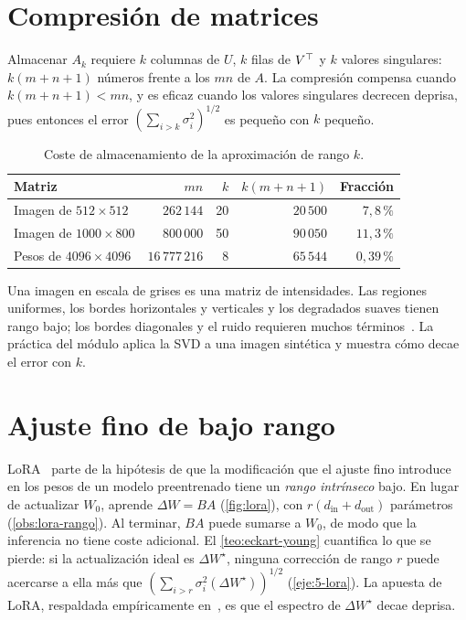 \addtocounter{definicion}{1}%

\section{Compresión de matrices}

Almacenar $A_k$ requiere $k$ columnas de $U$, $k$ filas de $V^{\top}$ y $k$ valores singulares: $k(m+n+1)$ números frente a los $mn$ de $A$. La compresión compensa cuando $k(m+n+1)<mn$, y es eficaz cuando los valores singulares decrecen deprisa, pues entonces el error $(\sum_{i>k}\sigma_i^{2})^{1/2}$ es pequeño con $k$ pequeño.

\begin{table}[h]
\centering\small
\caption{Coste de almacenamiento de la aproximación de rango $k$.}\label{tab:compresion}
\begin{tabular}{@{}lrrrr@{}}
\toprule
Matriz & $mn$ & $k$ & $k(m+n+1)$ & Fracción \\
\midrule
Imagen de $512\times 512$ & $262\,144$ & 20 & $20\,500$ & $7{,}8\,\%$ \\
Imagen de $1000\times 800$ & $800\,000$ & 50 & $90\,050$ & $11{,}3\,\%$ \\
Pesos de $4096\times 4096$ & $16\,777\,216$ & 8 & $65\,544$ & $0{,}39\,\%$ \\
\bottomrule
\end{tabular}
\end{table}

Una imagen en escala de grises es una matriz de intensidades. Las regiones uniformes, los bordes horizontales y verticales y los degradados suaves tienen rango bajo; los bordes diagonales y el ruido requieren muchos términos~\cite[§7.2]{strang-ila}. La práctica del módulo aplica la SVD a una imagen sintética y muestra cómo decae el error con $k$.

\section{Ajuste fino de bajo rango}

\addtocounter{figure}{1}%

LoRA~\cite{hu-lora} parte de la hipótesis de que la modificación que el ajuste fino introduce en los pesos de un modelo preentrenado tiene un \emph{rango intrínseco} bajo. En lugar de actualizar $W_0$, aprende $\Delta W=BA$ (\cref{fig:lora}), con $r(d_{\text{in}}+d_{\text{out}})$ parámetros (\cref{obs:lora-rango}). Al terminar, $BA$ puede sumarse a $W_0$, de modo que la inferencia no tiene coste adicional. El \cref{teo:eckart-young} cuantifica lo que se pierde: si la actualización ideal es $\Delta W^{\star}$, ninguna corrección de rango $r$ puede acercarse a ella más que $(\sum_{i>r}\sigma_i^{2}(\Delta W^{\star}))^{1/2}$ (\cref{eje:5-lora}). La apuesta de LoRA, respaldada empíricamente en~\cite{hu-lora}, es que el espectro de $\Delta W^{\star}$ decae deprisa.

